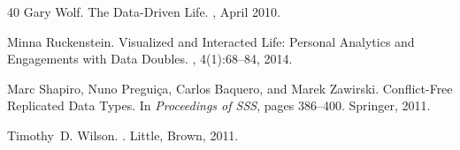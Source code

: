 \documentclass[manuscript,review]{acmart}
\begin{document}
\begin{thebibliography}{40}
Gary Wolf.
\newblock The Data-Driven Life.
, April 2010.

Minna Ruckenstein.
\newblock Visualized and Interacted Life: Personal Analytics and Engagements with Data Doubles.
, 4(1):68--84, 2014.

Marc Shapiro, Nuno Pregui{\c{c}}a, Carlos Baquero, and Marek Zawirski.
\newblock Conflict-Free Replicated Data Types.
\newblock In {\em Proceedings of SSS}, pages 386--400. Springer, 2011.

Timothy~D. Wilson.
.
\newblock Little, Brown, 2011.

\end{thebibliography}
\end{document}
